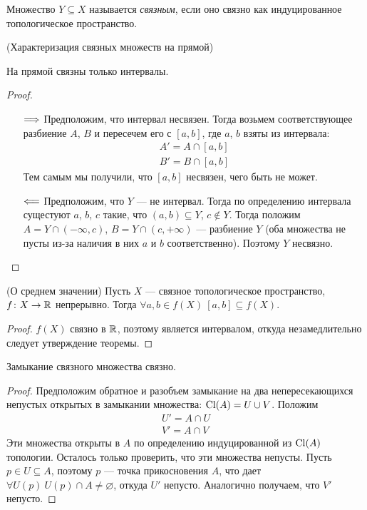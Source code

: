 \begin{definition}
	Множество $Y \subseteq X$ называется \textit{связным}, если оно связно как
	индуцированное топологическое пространство.
\end{definition}

\begin{theorem}(Характеризация связных множеств на прямой)

	На прямой связны только интервалы.
\end{theorem}
\begin{proof}
	\enewline
	\begin{itemize}
		\item[$\Longrightarrow$] Предположим, что интервал несвязен. Тогда
			возьмем соответствующее разбиение $A$, $B$ и пересечем его с
			$[a, b]$, где $a$, $b$ взяты из интервала:
\begin{align*}
	A' = A \cap [a, b] \\
	B' = B \cap [a, b]
\end{align*}
			Тем самым мы получили, что $[a, b]$ несвязен, чего быть не может.
		\item[$\Longleftarrow$] Предположим, что $Y$ --- не интервал. Тогда по определению
			интервала сущестуют $a$, $b$, $c$ такие, что $(a, b) \subseteq Y$, $c \notin Y$.
			Тогда положим $A = Y \cap (-\infty, c)$, $B = Y \cap (c, +\infty)$ --- разбиение
			$Y$ (оба множества не пусты из-за наличия в них $a$ и $b$ соответственно). 
			Поэтому $Y$ несвязно.
	\end{itemize}
\end{proof}

\begin{theorem}(О среднем значении)
	Пусть $X$ --- связное топологическое пространство, $f \colon X \to \mathbb{R}$ непрерывно.
	Тогда $\forall a, b \in f(X)~ [a, b] \subseteq f(X)$.
\end{theorem}
\begin{proof}
	$f(X)$ связно в $\mathbb{R}$, поэтому является интервалом, откуда незамедлительно
	следует утверждение теоремы.
\end{proof}

\begin{lemma}
	Замыкание связного множества связно.
\end{lemma}
\begin{proof}
	Предположим обратное и разобъем замыкание на два непересекающихся непустых
	открытых в замыкании множества: $\operatorname{Cl}(A) = U \cup V$. Положим
\begin{align*}
	U' = A \cap U \\
	V' = A \cap V
\end{align*}
	Эти множества открыты в $A$ по определению индуцированной из $\operatorname{Cl}(A)$ топологии.
	Осталось только проверить, что эти множества непусты. Пусть $p \in U \subseteq A$,
	поэтому $p$ --- точка прикосновения $A$, что дает $\forall U(p)~ U(p) \cap A \neq 
	\varnothing$, откуда $U'$ непусто. Аналогично получаем, что $V'$ непусто.
\end{proof}

